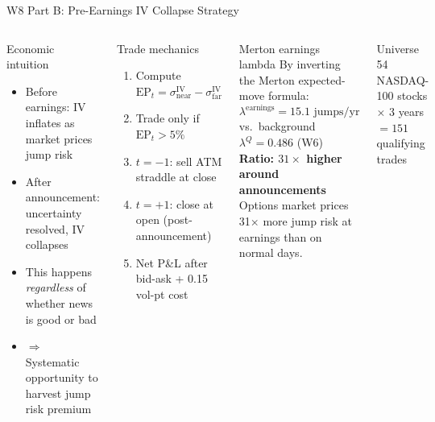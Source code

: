 \documentclass[aspectratio=169,10pt]{beamer}
\begin{document}
\begin{frame}{W8 Part B: Pre-Earnings IV Collapse Strategy}
\begin{columns}[T]
\begin{block}{Economic intuition}
\footnotesize
\begin{itemize}\itemsep3pt
  \item Before earnings: IV inflates as market prices jump risk
  \item After announcement: uncertainty resolved, IV collapses
  \item This happens \emph{regardless} of whether news is good or bad
  \item $\Rightarrow$ Systematic opportunity to harvest jump risk premium
\end{itemize}
\end{block}

\begin{block}{Trade mechanics}
\footnotesize
\begin{enumerate}\itemsep2pt
  \item Compute $\mathrm{EP}_t = \sigma^{\mathrm{IV}}_{\mathrm{near}} - \sigma^{\mathrm{IV}}_{\mathrm{far}}$
  \item Trade only if $\mathrm{EP}_t > 5\%$
  \item $t{=}{-1}$: sell ATM straddle at close
  \item $t{=}{+1}$: close at open (post-announcement)
  \item Net P\&L after bid-ask + 0.15 vol-pt cost
\end{enumerate}
\end{block}

\begin{block}{Merton earnings lambda}
\footnotesize
By inverting the Merton expected-move formula:
\[
  \lambda^{\mathrm{earnings}} = 15.1 \text{ jumps/yr}
\]
vs.\ background $\lambda^Q = 0.486$ (W6)\\[3pt]
\textbf{Ratio: $31\times$ higher around announcements}\\[3pt]
Options market prices 31$\times$ more jump risk at earnings than on normal days.
\end{block}

\begin{alertblock}{Universe}
\footnotesize
54 NASDAQ-100 stocks $\times$ 3 years\\
$= 151$ qualifying trades
\end{alertblock}
\end{columns}
\end{frame}
\end{document}
